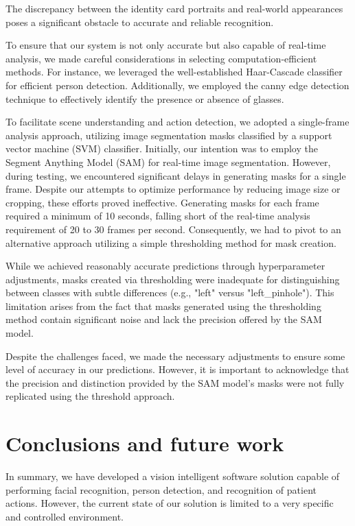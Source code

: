 \documentclass{article}
\begin{document}
The discrepancy between the identity card portraits and real-world appearances poses a significant obstacle to accurate and reliable recognition. 

To ensure that our system is not only accurate but also capable of real-time analysis, we made careful considerations in selecting computation-efficient methods. For instance, we leveraged the well-established Haar-Cascade classifier for efficient person detection. Additionally, we employed the canny edge detection technique to effectively identify the presence or absence of glasses.

To facilitate scene understanding and action detection, we adopted a single-frame analysis approach, utilizing image segmentation masks classified by a support vector machine (SVM) classifier. Initially, our intention was to employ the Segment Anything Model (SAM) for real-time image segmentation. However, during testing, we encountered significant delays in generating masks for a single frame. Despite our attempts to optimize performance by reducing image size or cropping, these efforts proved ineffective. Generating masks for each frame required a minimum of 10 seconds, falling short of the real-time analysis requirement of 20 to 30 frames per second. Consequently, we had to pivot to an alternative approach utilizing a simple thresholding method for mask creation.

While we achieved reasonably accurate predictions through hyperparameter adjustments, masks created via thresholding were inadequate for distinguishing between classes with subtle differences (e.g., "left" versus "left\_pinhole"). This limitation arises from the fact that masks generated using the thresholding method contain significant noise and lack the precision offered by the SAM model.

Despite the challenges faced, we made the necessary adjustments to ensure some level of accuracy in our predictions. However, it is important to acknowledge that the precision and distinction provided by the SAM model's masks were not fully replicated using the threshold approach. 

\section{Conclusions and future work}
In summary, we have developed a vision intelligent software solution capable of performing facial recognition, person detection, and recognition of patient actions. However, the current state of our solution is limited to a very specific and controlled environment. 
\end{document}
